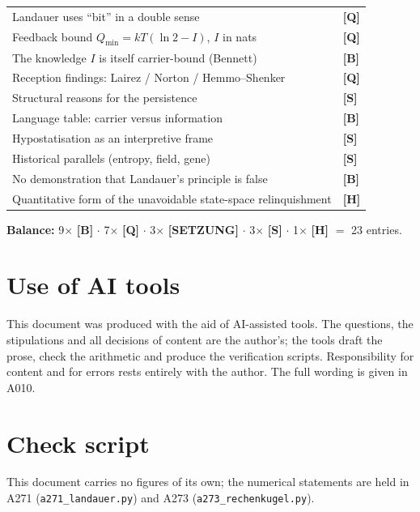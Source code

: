 \begin{center}
\begin{longtable}{@{}p{}l@{}}
Landauer uses “bit” in a double sense & \textbf{[Q]} \\
Feedback bound $Q_{\min} = kT(\ln 2 - I)$, $I$ in nats & \textbf{[Q]} \\
The knowledge $I$ is itself carrier-bound (Bennett) & \textbf{[B]} \\
Reception findings: Lairez / Norton / Hemmo--Shenker & \textbf{[Q]} \\
Structural reasons for the persistence & \textbf{[S]} \\
Language table: carrier versus information & \textbf{[B]} \\
Hypostatisation as an interpretive frame & \textbf{[S]} \\
Historical parallels (entropy, field, gene) & \textbf{[S]} \\
No demonstration that Landauer's principle is false & \textbf{[B]} \\
Quantitative form of the unavoidable state-space relinquishment & \textbf{[H]} \\
\bottomrule
\end{longtable}
\end{center}

\textbf{Balance:} 9$\times$ \textbf{[B]} $\cdot$ 7$\times$ \textbf{[Q]} $\cdot$ 3$\times$ \textbf{[SETZUNG]}
$\cdot$ 3$\times$ \textbf{[S]} $\cdot$ 1$\times$ \textbf{[H]} $=$ 23 entries.

\section{Use of AI tools}

This document was produced with the aid of AI-assisted tools. The questions, the
stipulations and all decisions of content are the author's; the tools draft the
prose, check the arithmetic and produce the verification scripts. Responsibility
for content and for errors rests entirely with the author. The full wording is
given in A010.

\section{Check script}

This document carries no figures of its own; the numerical statements are held in
A271 (\texttt{a271\_landauer.py}) and A273 (\texttt{a273\_rechenkugel.py}).

